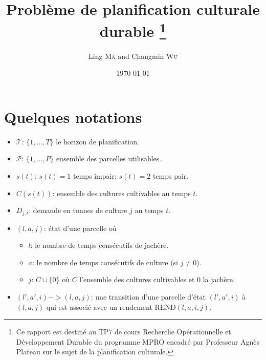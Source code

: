 \documentclass[a4paper]{article}
\title{Problème de planification culturale durable \footnote{Ce rapport est destiné au TP7 de cours Recherche Opérationnelle et Développement Durable du programme MPRO encadré par Professeur Agnès Plateau sur le sujet de la planification culturale.}}
\author{Ling \textsc{Ma} and Changmin \textsc{Wu}}
\date{\today}
\begin{document}
\maketitle
\tableofcontents

\section{Quelques notations}
\begin{itemize}
    \item $\mathcal{T}$: $\{1, \ldots, T\}$ le horizon de planification.
    \item $\mathcal{P}$: $\{1, \ldots, P\}$ ensemble des parcelles utilisables.
    \item $s(t)$: $s(t)=1$ temps impair; $s(t)=2$ temps pair.
    \item $C(s(t))$: ensemble des cultures cultivables au temps $t$.
    \item $D_{j,t}$: demande en tonnes de culture $j$ au temps $t$.
    \item $(l,a,j)$: état d'une parcelle où
    \begin{itemize}
        \item $l$: le nombre de temps consécutifs de jachère.
        \item $a$: le nombre de temps consécutifs de culture (si $j \neq 0$).
        \item $j$: $C \cup \{0\}$ où $C$ l'ensemble des cultures cultivables et $0$ la jachère.
    \end{itemize}
    \item $(l',a',i) -> (l,a,j)$: une transition d'une parcelle d'état $(l',a',i)$ à $(l,a,j)$ qui est associé avec un rendement $\text{REND}(l,a,i,j)$.
\end{itemize}
\end{document}
